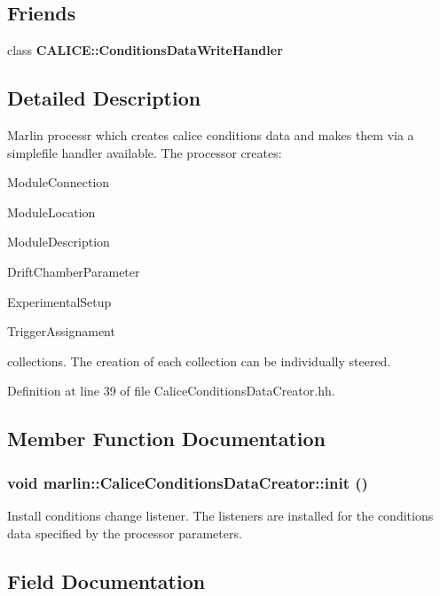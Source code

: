\subsection*{Friends}
\begin{DoxyCompactItemize}
\item 
class {\bfseries CALICE::ConditionsDataWriteHandler}\label{classmarlin_1_1CaliceConditionsDataCreator_a0e401bb1bfedeba5808934499877adf4}

\end{DoxyCompactItemize}


\subsection{Detailed Description}
Marlin processr which creates calice conditions data and makes them via a simplefile handler available. The processor creates: 
\begin{DoxyEnumerate}
\item ModuleConnection 
\item ModuleLocation 
\item ModuleDescription 
\item DriftChamberParameter 
\item ExperimentalSetup 
\item TriggerAssignament 
\end{DoxyEnumerate}collections. The creation of each collection can be individually steered. 

Definition at line 39 of file CaliceConditionsDataCreator.hh.

\subsection{Member Function Documentation}
\subsubsection[{init}]{\setlength{\rightskip}{0pt plus 5cm}void marlin::CaliceConditionsDataCreator::init ()}\label{classmarlin_1_1CaliceConditionsDataCreator_a53e34b9c420e45dda6bbab5f9f4400cc}


Install conditions change listener. The listeners are installed for the conditions data specified by the processor parameters. 

\subsection{Field Documentation}
